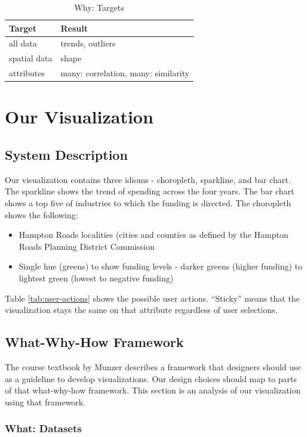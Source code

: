\documentclass[10pt,journal,compsoc]{IEEEtran}
\begin{document}
\begin{table}[t]
\centering
\caption{Why: Targets}
\label{tab:why-targets}
\begin{tabular}{l | l}
\textbf{Target} & \textbf{Result} \\
\hline
all data & trends, outliers\\
\hline
spatial data & shape \\
\hline
attributes & many: correlation, many: similarity \\
\hline
\end{tabular}
\end{table} 

\section{Our Visualization}

\subsection{System Description}
Our visualization contains three idioms - choropleth, sparkline, and bar chart. The sparkline shows the trend of spending across the four years. The bar chart shows a top five of industries to which the funding is directed. The choropleth shows the following:

\begin{itemize}
\item Hampton Roads localities (cities and counties as defined by the Hampton Roads Planning District Commission
\item Single hue (greens) to show funding levels - darker greens (higher funding) to lightest green (lowest to negative funding)
\end{itemize}

Table \ref{tab:user-actions} shows the possible user actions. ``Sticky'' means that the visualization stays the same on that attribute regardless of user selections.

\subsection{What-Why-How Framework}

The course textbook by Munzer describes a framework that designers should use as a guideline to develop visualizations. Our design choices should map to parts of that what-why-how framework. This section is an analysis of our visualization using that framework.

\subsubsection{What: Datasets}
\end{document}
